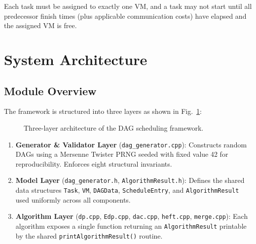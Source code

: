 \documentclass[conference]{IEEEtran}
\begin{document}
Each task must be assigned to exactly one VM, and a task may not
start until all predecessor finish times (plus applicable
communication costs) have elapsed and the assigned VM is free.

\section{System Architecture}
\label{sec:arch}

\subsection{Module Overview}

The framework is structured into three layers as shown in
Fig.~\ref{fig:arch}:

\begin{figure}[!t]
\centering
{}
\caption{Three-layer architecture of the DAG scheduling framework.}
\label{fig:arch}
\end{figure}

\begin{enumerate}
  \item \textbf{Generator \& Validator Layer} (\texttt{dag\_generator.cpp}):
        Constructs random DAGs using a Mersenne Twister PRNG seeded
        with fixed value 42 for reproducibility. Enforces eight
        structural invariants.
  \item \textbf{Model Layer} (\texttt{dag\_generator.h},
        \texttt{AlgorithmResult.h}): Defines the shared data
        structures \texttt{Task}, \texttt{VM}, \texttt{DAGData},
        \texttt{ScheduleEntry}, and \texttt{AlgorithmResult} used
        uniformly across all components.
  \item \textbf{Algorithm Layer} (\texttt{dp.cpp}, \texttt{Edp.cpp},
        \texttt{dac.cpp}, \texttt{heft.cpp}, \texttt{merge.cpp}): Each algorithm exposes a single function
        returning an \texttt{AlgorithmResult} printable by the shared
        \texttt{printAlgorithmResult()} routine.
\end{enumerate}
\end{document}

